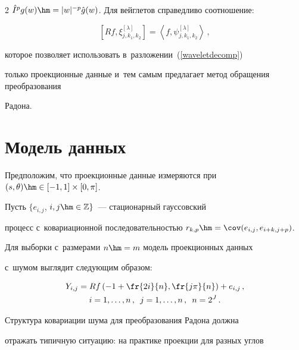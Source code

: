 \begin{multicols}{2}
$\hat{I}^{p} g(w) \hm= |w|^{-p} \hat{g}(w)$. Для вейглетов справедливо соотношение:


\begin{equation*}


\left[R f, \xi_{j,k_1,k_2}^{[\lambda]}\right] = \left\langle


f,\psi_{j,k_1,k_2}^{[\lambda]}\right\rangle\,,


\end{equation*}


которое позволяет использовать в~разложении~(\ref{waveletdecomp})


только проекционные данные и~тем самым предлагает метод обращения преобразования


Радона.








\section{Модель данных}





Предположим, что проекционные данные измеряются при $(s,\theta)\hm\in [-1,1]\times[0,\pi]$.


Пусть $\{e_{i,j}$, $i,j \hm \in \mathbb{Z}\}$~--- стационарный гауссовский


процесс с~ковариационной последовательностью $r_{k,p} \hm= \cov (e_{i,j},


e_{i+k,j+p})$.


Для выборки с~размерами $n \hm= m$ модель проекционных данных


с~шумом выглядит следующим образом:


\begin{multline*}


Y_{i,j} = R f\left(-1+\fr{2i}{n},\fr{j\pi}{n}\right) + e_{i,j}\,, \\


i = 1, \dots, n\,, \enskip j = 1, \dots, n\,, \enskip n=2^J\,.


\end{multline*}


%





Структура ковариации шума для преобразования Радона должна


отражать типичную ситуацию: на практике проекции для разных углов



\end{multicols}
